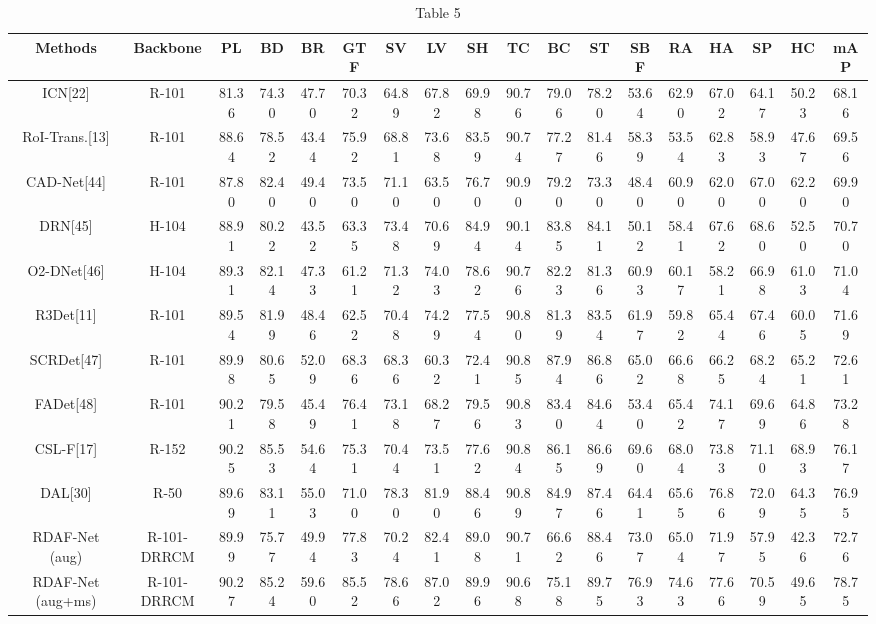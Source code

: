 \documentclass[10pt,twocolumn,final]{article}
\begin{document}
\begin{table}[tbp]
\centering
\begin{tabular}{c c c c c c c c c c c c c c c c c c}
\toprule
\textbf{Methods} & \textbf{Backbone} & \textbf{PL} & \textbf{BD} & \textbf{BR} & \textbf{GTF} & \textbf{SV} & \textbf{LV} & \textbf{SH} & \textbf{TC} & \textbf{BC} & \textbf{ST} & \textbf{SBF} & \textbf{RA} & \textbf{HA} & \textbf{SP} & \textbf{HC} & \textbf{mAP} \\
\midrule
ICN[22] & R-101 & 81.36 & 74.30 & 47.70 & 70.32 & 64.89 & 67.82 & 69.98 & 90.76 & 79.06 & 78.20 & 53.64 & 62.90 & 67.02 & 64.17 & 50.23 & 68.16 \\
RoI-Trans.[13] & R-101 & 88.64 & 78.52 & 43.44 & 75.92 & 68.81 & 73.68 & 83.59 & 90.74 & 77.27 & 81.46 & 58.39 & 53.54 & 62.83 & 58.93 & 47.67 & 69.56 \\
CAD-Net[44] & R-101 & 87.80 & 82.40 & 49.40 & 73.50 & 71.10 & 63.50 & 76.70 & 90.90 & 79.20 & 73.30 & 48.40 & 60.90 & 62.00 & 67.00 & 62.20 & 69.90 \\
DRN[45] & H-104 & 88.91 & 80.22 & 43.52 & 63.35 & 73.48 & 70.69 & 84.94 & 90.14 & 83.85 & 84.11 & 50.12 & 58.41 & 67.62 & 68.60 & 52.50 & 70.70 \\
O2-DNet[46] & H-104 & 89.31 & 82.14 & 47.33 & 61.21 & 71.32 & 74.03 & 78.62 & 90.76 & 82.23 & 81.36 & 60.93 & 60.17 & 58.21 & 66.98 & 61.03 & 71.04 \\
R3Det[11] & R-101 & 89.54 & 81.99 & 48.46 & 62.52 & 70.48 & 74.29 & 77.54 & 90.80 & 81.39 & 83.54 & 61.97 & 59.82 & 65.44 & 67.46 & 60.05 & 71.69 \\
SCRDet[47] & R-101 & 89.98 & 80.65 & 52.09 & 68.36 & 68.36 & 60.32 & 72.41 & 90.85 & 87.94 & 86.86 & 65.02 & 66.68 & 66.25 & 68.24 & 65.21 & 72.61 \\
FADet[48] & R-101 & 90.21 & 79.58 & 45.49 & 76.41 & 73.18 & 68.27 & 79.56 & 90.83 & 83.40 & 84.64 & 53.40 & 65.42 & 74.17 & 69.69 & 64.86 & 73.28 \\
CSL-F[17] & R-152 & 90.25 & 85.53 & 54.64 & 75.31 & 70.44 & 73.51 & 77.62 & 90.84 & 86.15 & 86.69 & 69.60 & 68.04 & 73.83 & 71.10 & 68.93 & 76.17 \\
DAL[30] & R-50 & 89.69 & 83.11 & 55.03 & 71.00 & 78.30 & 81.90 & 88.46 & 90.89 & 84.97 & 87.46 & 64.41 & 65.65 & 76.86 & 72.09 & 64.35 & 76.95 \\
RDAF-Net
(aug) & R-101-DRRCM & 89.99 & 75.77 & 49.94 & 77.83 & 70.24 & 82.41 & 89.08 & 90.71 & 66.62 & 88.46 & 73.07 & 65.04 & 71.97 & 57.95 & 42.36 & 72.76 \\
RDAF-Net
(aug+ms) & R-101-DRRCM & 90.27 & 85.24 & 59.60 & 85.52 & 78.66 & 87.02 & 89.96 & 90.68 & 75.18 & 89.75 & 76.93 & 74.63 & 77.66 & 70.59 & 49.65 & 78.75 \\
\bottomrule
\end{tabular}
\caption{Table 5}
\label{tab:tbl_5}
\end{table}
\end{document}
